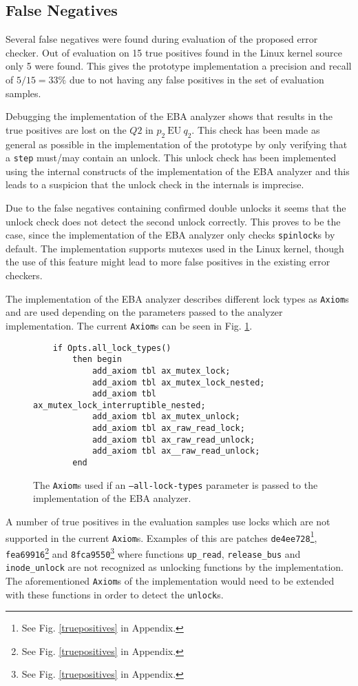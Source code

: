 \subsection{False Negatives}

Several false negatives were found during evaluation of the proposed error checker. Out of evaluation on 15 true positives found in the Linux kernel source only 5 were found. This gives the prototype implementation a precision and recall of $5/15=33\%$ due to not having any false positives in the set of evaluation samples. 

\newpar Debugging the implementation of the EBA analyzer shows that results in the true positives are lost on the $Q2$ in $p_2\:\mathrm{EU}\:q_2$. This check has been made as general as possible in the implementation of the prototype by only verifying that a \texttt{step} must/may contain an unlock. This unlock check has been implemented using the internal constructs of the implementation of the EBA analyzer and this leads to a suspicion that the unlock check in the internals is imprecise. 

\newpar Due to the false negatives containing confirmed double unlocks it seems that the unlock check does not detect the second unlock correctly. This proves to be the case, since the implementation of the EBA analyzer only checks \texttt{spinlock}s by default. The implementation supports mutexes used in the Linux kernel, though the use of this feature might lead to more false positives in the existing error checkers. 

\newpar The implementation of the EBA analyzer describes different lock types as \texttt{Axiom}s and are used depending on the parameters passed to the analyzer implementation. The current \texttt{Axiom}s can be seen in Fig. \ref{axioms}.  

\begin{figure}[H]
    \centering
    \begin{verbatim}
    if Opts.all_lock_types()
        then begin
            add_axiom tbl ax_mutex_lock;
            add_axiom tbl ax_mutex_lock_nested;
            add_axiom tbl ax_mutex_lock_interruptible_nested;
            add_axiom tbl ax_mutex_unlock;
            add_axiom tbl ax_raw_read_lock;
            add_axiom tbl ax_raw_read_unlock;
            add_axiom tbl ax__raw_read_unlock;
        end
    \end{verbatim}
    \caption{The \texttt{Axiom}s used if an \texttt{--all-lock-types} parameter is passed to the implementation of the EBA analyzer.}
    \label{axioms}
\end{figure}

\newpar A number of true positives in the evaluation samples use locks which are not supported in the current \texttt{Axiom}s. Examples of this are patches \texttt{de4ee728}\footnote{See Fig. \ref{truepositives} in Appendix.}, \texttt{fea69916}\footnote{See Fig. \ref{truepositives} in Appendix.} and \texttt{8fca9550}\footnote{See Fig. \ref{truepositives} in Appendix.} where functions \texttt{up\_read}, \texttt{release\_bus} and \texttt{inode\_unlock} are not recognized as unlocking functions by the implementation. The aforementioned \texttt{Axiom}s of the implementation would need to be extended with these functions in order to detect the \texttt{unlock}s.  